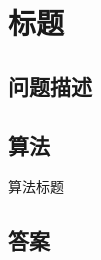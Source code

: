 \section{标题}
\subsection{问题描述}
\begin{tcolorbox}

\end{tcolorbox}

\subsection{算法}
\begin{algorithm}
	\caption{算法标题}
	\begin{algorithmic}[1]

	\end{algorithmic}
\end{algorithm}

\subsection{答案}
